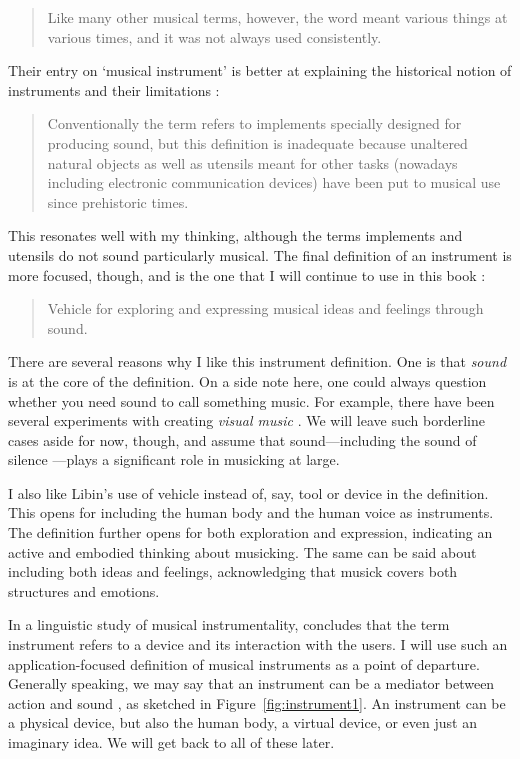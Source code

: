 \begin{quotation}
Like many other musical terms, however, the word meant various things at various times, and it was not always used consistently.
\end{quotation}

Their entry on `musical instrument' is better at explaining the historical notion of instruments and their limitations \citep{libin_musical_2018}:

\begin{quotation}
Conventionally the term refers to implements specially designed for producing sound, but this definition is inadequate because unaltered natural objects as well as utensils meant for other tasks (nowadays including electronic communication devices) have been put to musical use since prehistoric times.
\end{quotation}

This resonates well with my thinking, although the terms implements and utensils do not sound particularly musical. The final definition of an instrument is more focused, though, and is the one that I will continue to use in this book \citep{libin_musical_2018}:

\begin{quotation}
Vehicle for exploring and expressing musical ideas and feelings through sound.
\end{quotation}

There are several reasons why I like this instrument definition. One is that \emph{sound} is at the core of the definition. On a side note here, one could always question whether you need sound to call something music. For example, there have been several experiments with creating \emph{visual music} \citep{evans_foundations_2005,mcdonnell_finding_2020}. We will leave such borderline cases aside for now, though, and assume that sound---including the sound of silence \citep{cage_silence_1961}---plays a significant role in musicking at large.

I also like Libin's use of vehicle instead of, say, tool  or device in the definition. This opens for including the human body and the human voice as instruments. The definition further opens for both exploration and expression, indicating an active and embodied thinking about musicking. The same can be said about including both ideas and feelings, acknowledging that musick covers both structures and emotions.

In a linguistic study of musical instrumentality, \citet{cance_musical_2017} concludes that the term instrument refers to a device and its interaction with the users. I will use such an application-focused definition of musical instruments as a point of departure. Generally speaking, we may say that an instrument can be a mediator between action and sound \citep{bielawski_instrumentalmusik_1979,kvifte_instruments_1989}, as sketched in Figure~\ref{fig:instrument1}. An instrument can be a physical device, but also the human body, a virtual device, or even just an imaginary idea. We will get back to all of these later.

